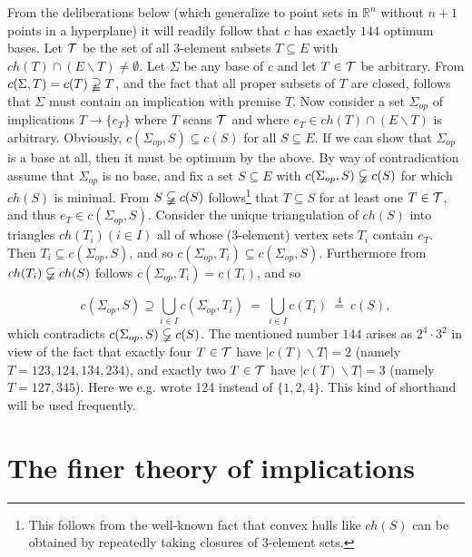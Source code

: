 \documentclass[11pt]{article}
\newcommand{\ds}{\displaystyle}
\newcommand{\R}{\mathbb{R}}
\newcommand{\ra}{\rightarrow}
\begin{document}
From the deliberations below (which generalize to point sets in $\R^n$ without $n+1$ points in a hyperplane) it will readily follow that $c$ has exactly $144$ optimum bases. 
Let ${\cal T}$ be the set of all 3-element subsets $T \subseteq E$ with $ch(T) \cap (E \backslash T)\neq \emptyset$.
Let $\Sigma$ be any base of $c$ and let $T \in {\cal T}$ be arbitrary. From $c(\Sigma, T) = c(T) \varsupsetneqq T$, and the fact that all proper subsets of $T$ are closed, follows that $\Sigma$ must contain an implication with premise $T$. Now consider a set $\Sigma_{op}$ of implications $T \ra \{e_T\}$ where $T$ scans ${\cal T}$ and where $e_T \in ch(T) \cap (E \backslash T)$ is arbitrary. Obviously, $c(\Sigma_{op}, S) \subseteq c(S)$ for all $S \subseteq E$. If we can show that $\Sigma_{op}$ is a base at all, then it must be optimum by the above. By way of contradication assume that $\Sigma_{op}$ is no base, and fix a set $S \subseteq E$ with $c(\Sigma_{op}, S) \varsubsetneqq c(S)$ for which $ch(S)$ is minimal. From $S \varsubsetneqq c(S)$ follows\footnote{This follows from the well-known fact that convex hulls like $ch(S)$ can be obtained by repeatedly taking closures of $3$-element sets.} that $T \subseteq S$ for at least one $T \in {\cal T}$, and thus $e_T \in c(\Sigma_{op}, S)$. Consider the unique triangulation of $ch(S)$ into triangles $ch(T_i)(i \in I)$ all of whose (3-element) vertex sets $T_i$ contain $e_T$. Then $T_i \subseteq c(\Sigma_{op}, S)$, and so $c(\Sigma_{op}, T_i) \subseteq c(\Sigma_{op}, S)$. Furthermore from $ch(T_i)\varsubsetneqq  ch(S)$ follows $c(\Sigma_{op}, T_i) = c(T_i)$, and so

$$c(\Sigma_{op}, S) \supseteq \ds\bigcup_{i\in I} c(\Sigma_{op},T_i)  \ = \ \ds\bigcup_{i \in I} c(T_i) \ \stackrel{4}{=} \ c(S),$$
which contradicts $c(\Sigma_{op}, S) \varsubsetneqq c(S)$.  The mentioned number $144$ arises as $2^4 \cdot 3^2$ in view of the fact that exactly four $T \in {\cal T}$ have $|c(T) \backslash T| =2$ (namely $T = 123, 124, 134, 234)$, and exactly two $T \in {\cal T}$ have $|c(T) \backslash T|=3$  (namely $T = 127, 345$). Here we e.g. wrote 124 instead of $\{1, 2, 4\}$. This kind of shorthand will be used frequently.




\section{The finer theory of implications}
\end{document}
